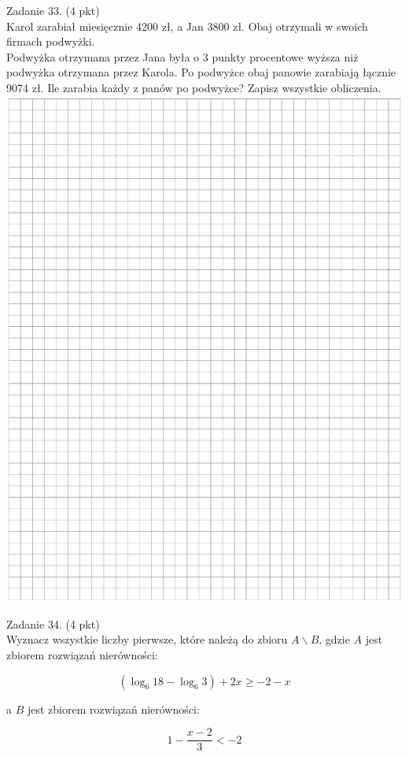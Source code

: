 \documentclass[10pt]{article}
\begin{document}
Zadanie 33. (4 pkt)\\
Karol zarabiał miesięcznie 4200 zł, a Jan 3800 zł. Obaj otrzymali w swoich firmach podwyżki.\\
Podwyżka otrzymana przez Jana była o 3 punkty procentowe wyższa niż podwyżka otrzymana przez Karola. Po podwyżce obaj panowie zarabiają łącznie 9074 zł. Ile zarabia każdy z panów po podwyżce? Zapisz wszystkie obliczenia.\\
\includegraphics[max width=\textwidth, center]{2024_11_21_0fa17f80dfe1c6bd3b66g-12}

Zadanie 34. (4 pkt)\\
Wyznacz wszystkie liczby pierwsze, które należą do zbioru \(A \backslash B\), gdzie \(A\) jest zbiorem rozwiązań nierówności:

\[
\left(\log _{6} 18-\log _{6} 3\right)+2 x \geq-2-x
\]

a \(B\) jest zbiorem rozwiązań nierówności:

\[
1-\frac{x-2}{3}<-2
\]
\end{document}
